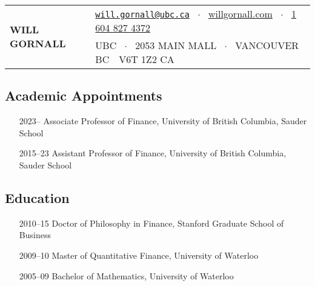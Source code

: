 \documentclass[11pt]{article}
\begin{document}
\noindent
\begin{tabular}{@{}l@{\quad}l}
\multirow{2}{*}{\huge\textbf{WILL GORNALL}} & 
\href{mailto:will.gornall@sauder.ubc.ca}{\nolinkurl{will.gornall@ubc.ca}} \ $\cdot$ \
\href{willgornall.com}{willgornall.com} \ $\cdot$ \ 
\href{tel:1 604 827 4372}{1 604 827 4372} 
\\
&  
UBC \ $\cdot$ \
2053 MAIN MALL \ $\cdot$ \ 
VANCOUVER BC\ \ V6T 1Z2 CA
\end{tabular}


\subsection*{Academic Appointments}
\begin{itemize}
    \item[2023--] Associate Professor of Finance, University of British Columbia, Sauder School
    \item[2015--23] Assistant Professor of Finance, University of British Columbia, Sauder School
\end{itemize}

\subsection*{Education}
\begin{itemize}
    \item[2010--15] Doctor of Philosophy in Finance, Stanford Graduate School of Business
    \item[2009--10] Master of Quantitative Finance, University of Waterloo
    \item[2005--09] Bachelor of Mathematics, University of Waterloo
\end{itemize}
\end{document}
